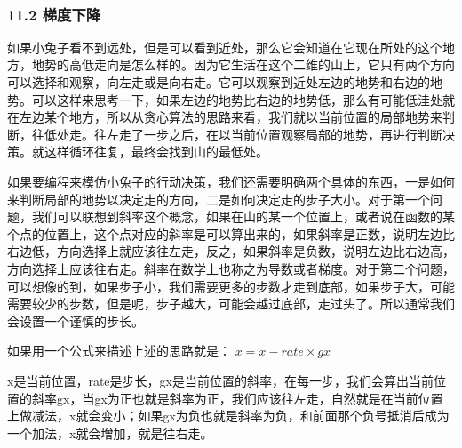 \documentclass[11pt]{article}
\begin{document}
    \begin{center}
    \end{center}
    { \hspace*{\fill} \\}
    
    \subsubsection{11.2 梯度下降}\label{ux68afux5ea6ux4e0bux964d}

    如果小兔子看不到远处，但是可以看到近处，那么它会知道在它现在所处的这个地方，地势的高低走向是怎么样的。因为它生活在这个二维的山上，它只有两个方向可以选择和观察，向左走或是向右走。它可以观察到近处左边的地势和右边的地势。可以这样来思考一下，如果左边的地势比右边的地势低，那么有可能低洼处就在左边某个地方，所以从贪心算法的思路来看，我们就以当前位置的局部地势来判断，往低处走。往左走了一步之后，在以当前位置观察局部的地势，再进行判断决策。就这样循环往复，最终会找到山的最低处。

    如果要编程来模仿小兔子的行动决策，我们还需要明确两个具体的东西，一是如何来判断局部的地势以决定走的方向，二是如何决定走的步子大小。对于第一个问题，我们可以联想到斜率这个概念，如果在山的某一个位置上，或者说在函数的某个点的位置上，这个点对应的斜率是可以算出来的，如果斜率是正数，说明左边比右边低，方向选择上就应该往左走，反之，如果斜率是负数，说明左边比右边高，方向选择上应该往右走。斜率在数学上也称之为导数或者梯度。对于第二个问题，可以想像的到，如果步子小，我们需要更多的步数才走到底部，如果步子大，可能需要较少的步数，但是呢，步子越大，可能会越过底部，走过头了。所以通常我们会设置一个谨慎的步长。

    如果用一个公式来描述上述的思路就是： \(x = x - rate\times gx\)

x是当前位置，rate是步长，gx是当前位置的斜率，在每一步，我们会算出当前位置的斜率gx，当gx为正也就是斜率为正，我们应该往左走，自然就是在当前位置上做减法，x就会变小；如果gx为负也就是斜率为负，和前面那个负号抵消后成为一个加法，x就会增加，就是往右走。
\end{document}
